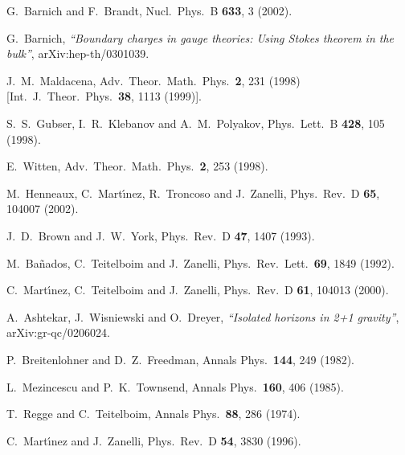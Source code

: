 \documentclass[a4paper,12pt]{article}
\begin{document}
\begin{thebibliography}{99}
  G.~Barnich and F.~Brandt, 
Nucl.\ Phys.\ B \textbf{633}, 3 (2002). 

G.~Barnich, 
{\it``Boundary charges in gauge theories: Using Stokes theorem in the bulk''},
arXiv:hep-th/0301039.




  J.~M.~Maldacena, 
Adv.\ Theor.\ Math.\ Phys.\ \textbf{2}, 231 (1998) [Int.\ J.\ Theor.\ Phys.\ 
\textbf{38}, 1113 (1999)]. 


  S.~S.~Gubser, I.~R.~Klebanov and A.~M.~Polyakov, 
Phys.\ Lett.\ B \textbf{428}, 105 (1998). 


  E.~Witten, 
Adv.\ Theor.\ Math.\ Phys.\ \textbf{2}, 253 (1998). 


  M.~Henneaux, C.~Mart\'{\i }nez, R.~Troncoso and J.~Zanelli, 
Phys.\ Rev.\ D \textbf{65}, 104007 (2002). 


  J.~D.~Brown and J.~W.~York, 
Phys.\ Rev.\ D \textbf{47}, 1407 (1993). %


  M.~Ba{\~n}ados, C.~Teitelboim and J.~Zanelli, 
Phys.\ Rev.\ Lett.\ \textbf{69}, 1849 (1992). 


  C.~Mart\'{\i }nez, C.~Teitelboim and J.~Zanelli, 
Phys.\ Rev.\ D \textbf{61}, 104013 (2000). 



A.~Ashtekar, J.~Wisniewski and O.~Dreyer, 
{\it``Isolated horizons in 2+1 gravity''},
arXiv:gr-qc/0206024.



  P.~Breitenlohner and D.~Z.~Freedman, 
Annals Phys.\ \textbf{144}, 249 (1982). 


  L.~Mezincescu and P.~K.~Townsend, 
Annals Phys.\ \textbf{160}, 406 (1985). 


  T.~Regge and C.~Teitelboim, 
Annals Phys.\ \textbf{88}, 286 (1974). 


  C.~Mart\'{\i }nez and J.~Zanelli, 
Phys.\ Rev.\ D \textbf{54}, 3830 (1996). 



\end{thebibliography}
\end{document}
